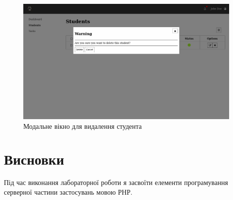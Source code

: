 \documentclass{article}
\begin{document}
\begin{normalsize}
\begin{figure}[H]
	\centering
	\includegraphics[scale=0.35]{7}
	\caption{Модальне вікно для видалення студента}
\end{figure}

\section*{Висновки}
Під час виконання лабораторної роботи я засвоїти елементи програмування серверної частини застосувань мовою РНР.
	    
\end{normalsize}
\end{document}
